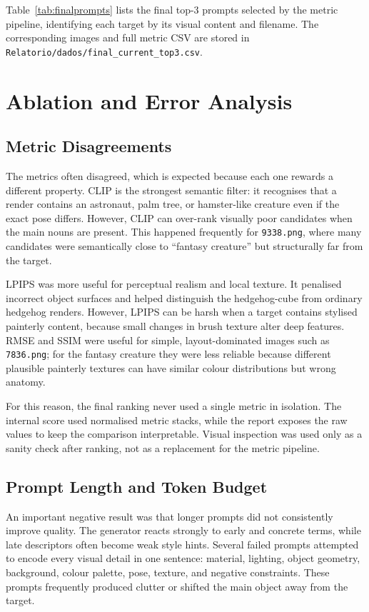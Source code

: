 \documentclass[runningheads]{llncs}
\newcommand{\imgpath}[1]{\texttt{#1}}
\begin{document}
Table~\ref{tab:finalprompts} lists the final top-3 prompts selected by the metric pipeline, identifying each target by its visual content and filename. The corresponding images and full metric CSV are stored in \texttt{Relatorio/dados/final\_current\_top3.csv}.

{\scriptsize

}

\section{Ablation and Error Analysis}

\subsection{Metric Disagreements}

The metrics often disagreed, which is expected because each one rewards a different property. CLIP is the strongest semantic filter: it recognises that a render contains an astronaut, palm tree, or hamster-like creature even if the exact pose differs. However, CLIP can over-rank visually poor candidates when the main nouns are present. This happened frequently for \imgpath{9338.png}, where many candidates were semantically close to ``fantasy creature'' but structurally far from the target.

LPIPS was more useful for perceptual realism and local texture. It penalised incorrect object surfaces and helped distinguish the hedgehog-cube from ordinary hedgehog renders. However, LPIPS can be harsh when a target contains stylised painterly content, because small changes in brush texture alter deep features. RMSE and SSIM were useful for simple, layout-dominated images such as \imgpath{7836.png}; for the fantasy creature they were less reliable because different plausible painterly textures can have similar colour distributions but wrong anatomy.

For this reason, the final ranking never used a single metric in isolation. The internal score used normalised metric stacks, while the report exposes the raw values to keep the comparison interpretable. Visual inspection was used only as a sanity check after ranking, not as a replacement for the metric pipeline.

\subsection{Prompt Length and Token Budget}

An important negative result was that longer prompts did not consistently improve quality. The generator reacts strongly to early and concrete terms, while late descriptors often become weak style hints. Several failed prompts attempted to encode every visual detail in one sentence: material, lighting, object geometry, background, colour palette, pose, texture, and negative constraints. These prompts frequently produced clutter or shifted the main object away from the target.
\end{document}
